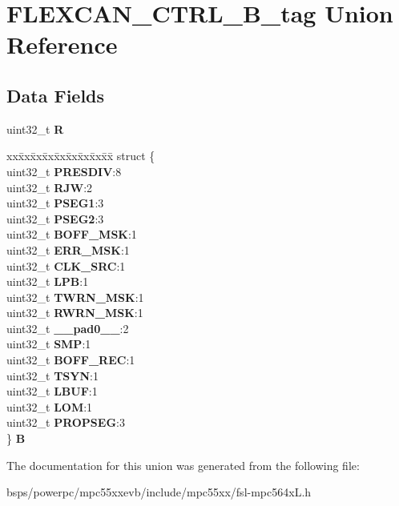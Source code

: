 \hypertarget{unionFLEXCAN__CTRL__32B__tag}{}\section{F\+L\+E\+X\+C\+A\+N\+\_\+\+C\+T\+R\+L\+\_\+B\+\_\+tag Union Reference}
\label{unionFLEXCAN__CTRL__32B__tag}
\subsection*{Data Fields}
\begin{DoxyCompactItemize}
\item 
\mbox{\label{unionFLEXCAN__CTRL__32B__tag_a6ecfd2fd81ad80ae5993c4fd9bfca9de}} 
uint32\+\_\+t {\bfseries R}
\item 
\mbox{\label{unionFLEXCAN__CTRL__32B__tag_aaa2465e1a7f4c9be476b6bc3546e1391}} 
\begin{tabbing}
xx\=xx\=xx\=xx\=xx\=xx\=xx\=xx\=xx\=\kill
struct \{\\
\>uint32\_t {\bfseries PRESDIV}:8\\
\>uint32\_t {\bfseries RJW}:2\\
\>uint32\_t {\bfseries PSEG1}:3\\
\>uint32\_t {\bfseries PSEG2}:3\\
\>uint32\_t {\bfseries BOFF\_MSK}:1\\
\>uint32\_t {\bfseries ERR\_MSK}:1\\
\>uint32\_t {\bfseries CLK\_SRC}:1\\
\>uint32\_t {\bfseries LPB}:1\\
\>uint32\_t {\bfseries TWRN\_MSK}:1\\
\>uint32\_t {\bfseries RWRN\_MSK}:1\\
\>uint32\_t {\bfseries \_\_pad0\_\_}:2\\
\>uint32\_t {\bfseries SMP}:1\\
\>uint32\_t {\bfseries BOFF\_REC}:1\\
\>uint32\_t {\bfseries TSYN}:1\\
\>uint32\_t {\bfseries LBUF}:1\\
\>uint32\_t {\bfseries LOM}:1\\
\>uint32\_t {\bfseries PROPSEG}:3\\
\} {\bfseries B}\\

\end{tabbing}\end{DoxyCompactItemize}


The documentation for this union was generated from the following file\+:\begin{DoxyCompactItemize}
\item 
bsps/powerpc/mpc55xxevb/include/mpc55xx/fsl-\/mpc564x\+L.\+h\end{DoxyCompactItemize}
